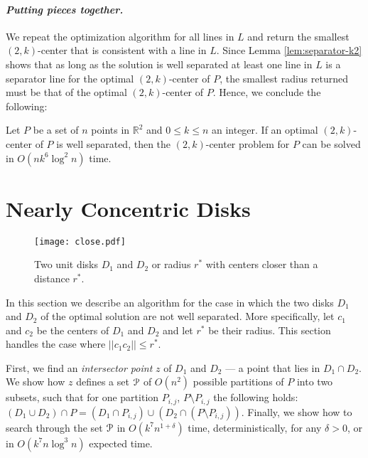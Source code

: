 \documentclass[11pt]{myclass}
\renewcommand{\b}[1]{\ensuremath{\mathbb{#1}}}
\newcommand{\EuP}{\ensuremath{\EuScript{P}}}
\begin{document}
\paragraph{\textbf{\emph{Putting pieces together.}}}
We repeat the optimization algorithm for all lines in $L$ and return the smallest $(2,k)$-center that is consistent with a line in $L$.  
Since Lemma \ref{lem:separator-k2} shows that as long as the solution is well separated at least one line in $L$ is a separator line for the optimal $(2,k)$-center of $P$, the smallest radius returned must be that of the optimal $(2,k)$-center of $P$.
Hence, we conclude the following:

\begin{lemma}
Let $P$ be a set of $n$ points in $\b{R}^2$ and $0 \leq k \leq n$ an integer.  
If an optimal $(2,k)$-center of $P$ is well separated, then the $(2,k)$-center problem for $P$ can be solved in $O(n k^6 \log^2 n)$ time. 
\label{lem:far}
\end{lemma}








\section{Nearly Concentric Disks}
\label{sec:near}

\begin{figure}[ht]
  \centering
  \texttt{[image: close.pdf]}
  \caption{\label{fig:near}
          Two unit disks $D_1$ and $D_2$ or radius $r^*$ with centers closer than a distance $r^*$.  
      }
\end{figure}


In this section we describe an algorithm for the case in which the two disks $D_1$ and $D_2$ of the optimal solution are not well separated.  More specifically, let $c_1$ and $c_2$ be the centers of $D_1$ and $D_2$ and let $r^*$ be their radius.  This section handles the case where $||c_1 c_2|| \leq r^*$.  

First, we find an \emph{intersector point} $z$ of $D_1$ and $D_2$ --- a point that lies in $D_1 \cap D_2$.  
We show how $z$ defines a set $\EuP$ of $O(n^2)$ possible partitions of $P$ into two subsets, such that for one partition $P_{i,j}$, $P \setminus P_{i,j}$ the following holds: $(D_1 \cup D_2) \cap P = (D_1 \cap P_{i,j}) \cup (D_2 \cap (P \setminus P_{i,j}))$.
Finally, we show how to search through the set $\EuP$ in $O(k^{7} n^{1+\delta})$ time, deterministically, for any $\delta>0$, or in $O(k^{7} n \log^3 n)$ expected time.  
\end{document}
